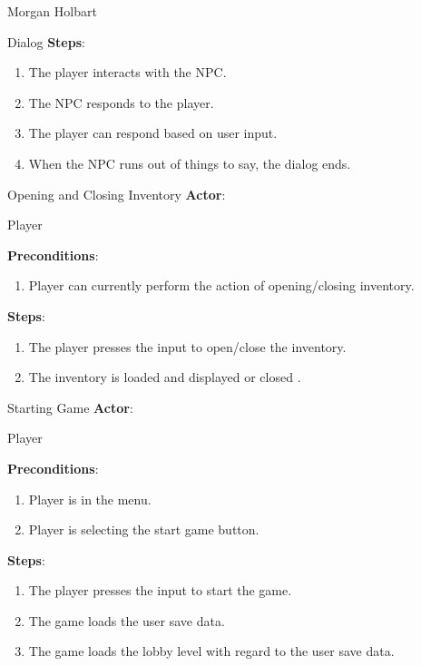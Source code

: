 \documentclass[12pt]{report}
\begin{document}
\begin{section}{Morgan Holbart}
\begin{subsection}{Dialog}
\textbf{Steps}:

\begin{enumerate}
\item The player interacts with the NPC.
\item The NPC responds to the player.
\item The player can respond based on user input.
\item When the NPC runs out of things to say, the dialog ends.
\end{enumerate}
\end{subsection}

\begin{subsection}{Opening and Closing Inventory}
\textbf{Actor}:

Player

\textbf{Preconditions}:
 
\begin{enumerate}
\item Player can currently perform the action of opening/closing inventory.
\end{enumerate}

\textbf{Steps}:

\begin{enumerate}
\item The player presses the input to open/close the inventory.
\item The inventory is loaded and displayed or closed .
\end{enumerate}
\end{subsection}

\begin{subsection}{Starting Game}
\textbf{Actor}:

Player

\textbf{Preconditions}:
 
\begin{enumerate}
\item Player is in the menu.
\item Player is selecting the start game button.
\end{enumerate}

\textbf{Steps}:

\begin{enumerate}
\item The player presses the input to start the game.
\item The game loads the user save data.
\item The game loads the lobby level with regard to the user save data.
\end{enumerate}
\end{subsection}


\end{section}
\end{document}

